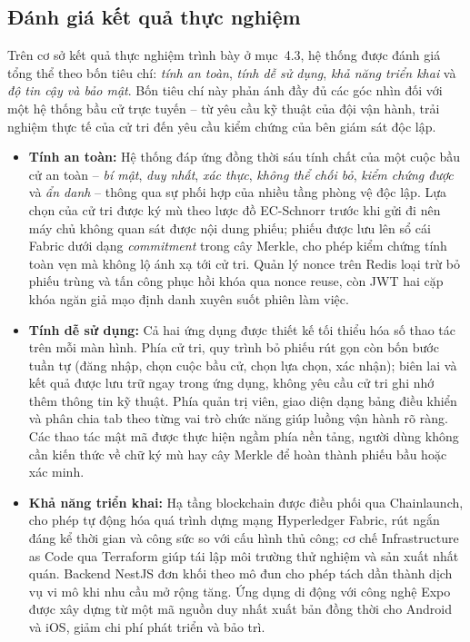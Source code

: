 \subsection{Đánh giá kết quả thực nghiệm}

Trên cơ sở kết quả thực nghiệm trình bày ở mục~4.3, hệ thống được đánh giá tổng thể theo bốn tiêu chí: \textit{tính an toàn}, \textit{tính dễ sử dụng}, \textit{khả năng triển khai} và \textit{độ tin cậy và bảo mật}. Bốn tiêu chí này phản ánh đầy đủ các góc nhìn đối với một hệ thống bầu cử trực tuyến -- từ yêu cầu kỹ thuật của đội vận hành, trải nghiệm thực tế của cử tri đến yêu cầu kiểm chứng của bên giám sát độc lập.

\begin{itemize}
    \item \textbf{Tính an toàn:} Hệ thống đáp ứng đồng thời sáu tính chất của một cuộc bầu cử an toàn -- \textit{bí mật}, \textit{duy nhất}, \textit{xác thực}, \textit{không thể chối bỏ}, \textit{kiểm chứng được} và \textit{ẩn danh} -- thông qua sự phối hợp của nhiều tầng phòng vệ độc lập. Lựa chọn của cử tri được ký mù theo lược đồ EC-Schnorr trước khi gửi đi nên máy chủ không quan sát được nội dung phiếu; phiếu được lưu lên sổ cái Fabric dưới dạng \textit{commitment} trong cây Merkle, cho phép kiểm chứng tính toàn vẹn mà không lộ ánh xạ tới cử tri. Quản lý nonce trên Redis loại trừ bỏ phiếu trùng và tấn công phục hồi khóa qua nonce reuse, còn JWT hai cặp khóa ngăn giả mạo định danh xuyên suốt phiên làm việc.

    \item \textbf{Tính dễ sử dụng:} Cả hai ứng dụng được thiết kế tối thiểu hóa số thao tác trên mỗi màn hình. Phía cử tri, quy trình bỏ phiếu rút gọn còn bốn bước tuần tự (đăng nhập, chọn cuộc bầu cử, chọn lựa chọn, xác nhận); biên lai và kết quả được lưu trữ ngay trong ứng dụng, không yêu cầu cử tri ghi nhớ thêm thông tin kỹ thuật. Phía quản trị viên, giao diện dạng bảng điều khiển và phân chia tab theo từng vai trò chức năng giúp luồng vận hành rõ ràng. Các thao tác mật mã được thực hiện ngầm phía nền tảng, người dùng không cần kiến thức về chữ ký mù hay cây Merkle để hoàn thành phiếu bầu hoặc xác minh.

    \item \textbf{Khả năng triển khai:} Hạ tầng blockchain được điều phối qua Chainlaunch, cho phép tự động hóa quá trình dựng mạng Hyperledger Fabric, rút ngắn đáng kể thời gian và công sức so với cấu hình thủ công; cơ chế Infrastructure as Code qua Terraform giúp tái lập môi trường thử nghiệm và sản xuất nhất quán. Backend NestJS đơn khối theo mô đun cho phép tách dần thành dịch vụ vi mô khi nhu cầu mở rộng tăng. Ứng dụng di động với công nghệ Expo được xây dựng từ một mã nguồn duy nhất xuất bản đồng thời cho Android và iOS, giảm chi phí phát triển và bảo trì.


\end{itemize}
